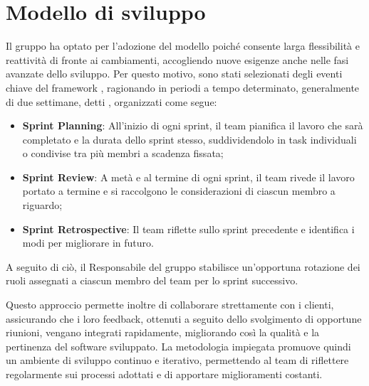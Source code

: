 \section{Modello di sviluppo}
Il gruppo ha optato per l'adozione del modello  poiché consente larga flessibilità e reattività di fronte ai cambiamenti, accogliendo nuove esigenze anche nelle fasi avanzate dello sviluppo. Per questo motivo, sono stati selezionati degli eventi chiave del framework , ragionando in periodi a tempo determinato, generalmente di due settimane, detti , organizzati come segue:
\begin{itemize}
    \item \textbf{Sprint Planning}: All'inizio di ogni sprint, il team pianifica il lavoro che sarà completato e la durata dello  sprint stesso, suddividendolo in task individuali o condivise tra più membri a scadenza fissata;
    \item \textbf{Sprint Review}: A metà e al termine di ogni sprint, il team rivede il lavoro portato a termine e si raccolgono le considerazioni di ciascun membro a riguardo;
    \item \textbf{Sprint Retrospective}: Il team riflette sullo sprint precedente e identifica i modi per migliorare in futuro.
\end{itemize}
A seguito di ciò, il Responsabile del gruppo stabilisce un'opportuna rotazione dei ruoli assegnati a ciascun membro del team per lo sprint successivo.

Questo approccio permette inoltre di collaborare strettamente con i clienti, assicurando che i loro feedback, ottenuti a seguito dello svolgimento di opportune riunioni, vengano integrati rapidamente, migliorando così la qualità e la pertinenza del software sviluppato. 
La metodologia impiegata promuove quindi un ambiente di sviluppo continuo e iterativo, permettendo al team di riflettere regolarmente sui processi adottati e di apportare miglioramenti costanti.